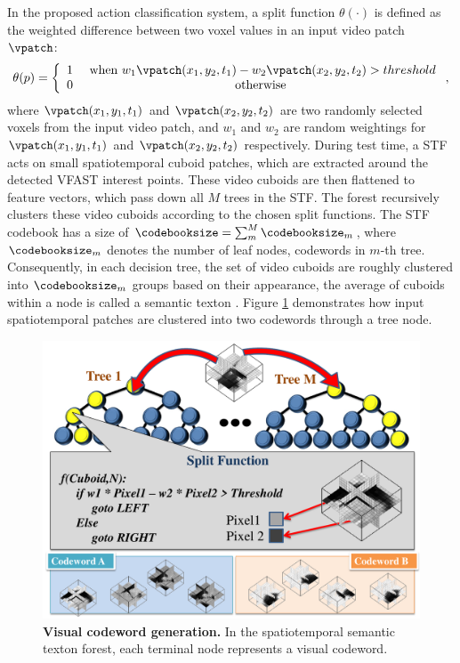 In the proposed action classification system, a split function $\theta(\cdot)$ is defined as the weighted difference between two voxel values in an input video patch $\vpatch$:
\begin{equation}
	\theta(p) = 
	\left\{
		\begin{array}{lc}
			1 & \mbox{ when } w_1 \vpatch(x_1,y_2,t_1) - w_2 \vpatch(x_2,y_2,t_2) > threshold \\  
			0 & \mbox{ otherwise } 
		\end{array}
	\right.,
	\label{eqn/act/stftest}
\end{equation}
where $\vpatch(x_1, y_1, t_1)$ and $\vpatch(x_2, y_2, t_2)$ are two randomly selected voxels from the input video patch, and $w_1$ and $w_2$ are random weightings for $\vpatch(x_1,y_1,t_1)$ and $\vpatch(x_2,y_2,t_2)$ respectively. 
During test time, a STF acts on small spatiotemporal cuboid patches, which are extracted around the detected VFAST interest points. These video cuboids are then flattened to feature vectors, which pass down all $M$ trees in the STF. 
The forest recursively clusters these video cuboids according to the chosen split functions.  
The STF codebook has a size of $\codebooksize=\sum_m^M \codebooksize_m$, where $\codebooksize_m$ denotes the number of leaf nodes, \ie codewords in $m$-th tree. 
Consequently, in each decision tree, the set of video cuboids are roughly clustered into $\codebooksize_m$ groups based on their appearance, the average of cuboids within a node is called a semantic texton \cite{Shotton2008}. 
Figure \ref{fig/act/stf} demonstrates how input spatiotemporal patches are clustered into two codewords through a tree node. 

\begin{figure}[ht]
	\centering 
	\includegraphics[width=0.8\linewidth]{fig/act/stf_new.pdf} 
	\caption{\textbf{Visual codeword generation.} In the spatiotemporal semantic texton forest, each terminal node represents a visual codeword.}
	\label{fig/act/stf}
\end{figure}

